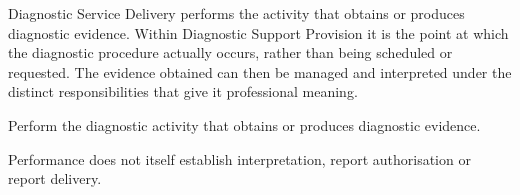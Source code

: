 Diagnostic Service Delivery performs the activity that obtains or produces diagnostic evidence. Within Diagnostic Support Provision it is the point at which the diagnostic procedure actually occurs, rather than being scheduled or requested. The evidence obtained can then be managed and interpreted under the distinct responsibilities that give it professional meaning.



Perform the diagnostic activity that obtains or produces diagnostic evidence.



Performance does not itself establish interpretation, report authorisation or report delivery.


